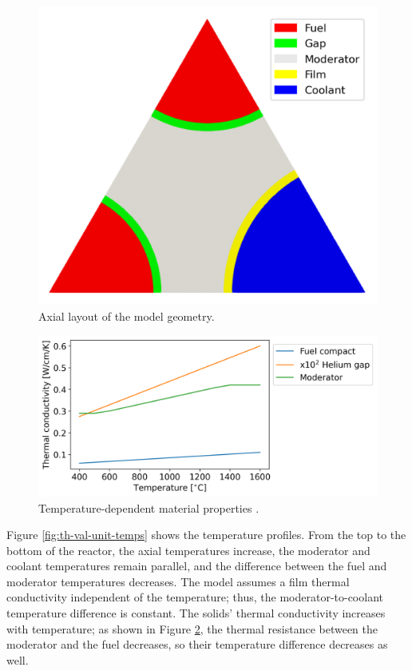 \begin{figure}[htbp!]
  \centering
  \includegraphics[width=0.40\linewidth]{figures-thermal/unitcell2}
  \hfill
  \caption{Axial layout of the model geometry.}
  \label{fig:th-val-unit-model}
\end{figure}

\begin{figure}[htbp!]
  \centering
  \includegraphics[width=0.60\linewidth]{figures-thermal/val-unit-matprop}
  \hfill
  \caption{Temperature-dependent material properties \cite{tak_numerical_2008}.}
  \label{fig:th-val-unit-model-b}
\end{figure}

Figure \ref{fig:th-val-unit-temps} shows the temperature profiles.
From the top to the bottom of the reactor, the axial temperatures increase, the moderator and coolant temperatures remain parallel, and the difference between the fuel and moderator temperatures decreases.
The model assumes a film thermal conductivity independent of the temperature; thus, the moderator-to-coolant temperature difference is constant.
The solids' thermal conductivity increases with temperature; as shown in Figure \ref{fig:th-val-unit-model-b}, the thermal resistance between the moderator and the fuel decreases, so their temperature difference decreases as well.


